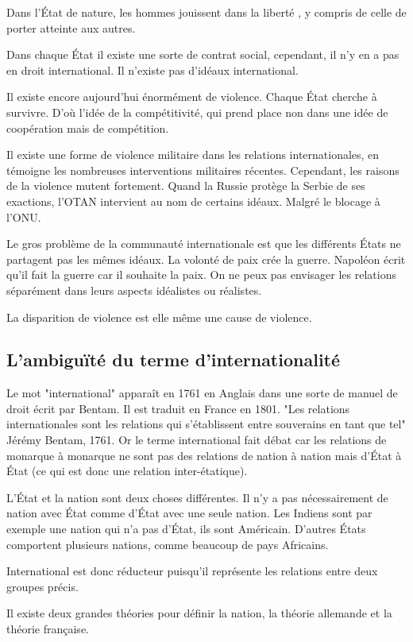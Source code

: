 ﻿\documentclass[12pt, a4paper, openany]{book}
\begin{document}
Dans l'État de nature, les hommes jouissent dans la liberté , y compris de celle de porter atteinte aux autres.

Dans chaque État il existe une sorte de contrat social, cependant, il n'y en a pas en droit international. Il n'existe pas d'idéaux international.

Il existe encore aujourd'hui énormément de violence. Chaque État cherche à survivre. D'où l'idée de la compétitivité, qui prend place non dans une idée de coopération mais de compétition.

Il existe une forme de violence militaire dans les relations internationales, en témoigne les nombreuses interventions militaires récentes. Cependant, les raisons de la violence mutent fortement. Quand la Russie protège la Serbie de ses exactions, l'OTAN intervient au nom de certains idéaux. Malgré le blocage à l'ONU.

Le gros problème de la communauté internationale est que les différents États ne partagent pas les mêmes idéaux. La volonté de paix crée la guerre. Napoléon écrit qu'il fait la guerre car il souhaite la paix. On ne peux pas envisager les relations séparément dans leurs aspects idéalistes ou réalistes.

La disparition de violence est elle même une cause de violence.

		\subsection{L'ambiguïté du terme d'internationalité}
		
Le mot "international" apparaît en 1761 en Anglais dans une sorte de manuel de droit écrit par Bentam. Il est traduit en France en 1801. "Les relations internationales sont les relations qui s'établissent entre souverains en tant que tel" Jérémy Bentam, 1761. Or le terme international fait débat car les relations de monarque à monarque ne sont pas des relations de nation à nation mais d'État à État (ce qui est donc une relation inter-étatique).

L'État et la nation sont deux choses différentes. Il n'y a pas nécessairement de nation avec État comme d'État avec une seule nation. Les Indiens sont par exemple une nation qui n'a pas d'État, ils sont Américain. D'autres États comportent plusieurs nations, comme beaucoup de pays Africains.

International est donc réducteur puisqu'il représente les relations entre deux groupes précis.

Il existe deux grandes théories pour définir la nation, la théorie allemande et la théorie française.
\end{document}
